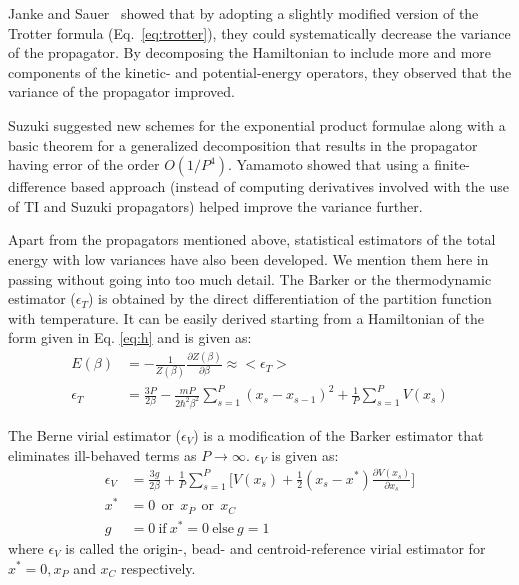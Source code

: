         Janke and Sauer~\cite{Janke1992} showed that by adopting a slightly modified version of the Trotter formula (Eq.~\eqref{eq:trotter}), they could systematically decrease the variance of the propagator. By decomposing the Hamiltonian to include more and more components of the kinetic- and potential-energy operators, they observed that the variance of the propagator improved.

        Suzuki \cite{Suzuki1995} suggested new schemes for the exponential product formulae along with a basic theorem for a generalized decomposition that results in the propagator having error of the order $O(1/P^4)$. Yamamoto \cite{Yamamoto2005} showed that using a finite-difference based approach (instead of computing derivatives involved with the use of TI and Suzuki propagators) helped improve the variance further.
        
        Apart from the propagators mentioned above, statistical estimators of the total energy with low variances have also been developed. We mention them here in passing without going into too much detail. The Barker or the thermodynamic estimator\cite{Barker1979} ($\epsilon_T$) is obtained by the direct differentiation of the partition function with temperature. It can be easily derived starting from a Hamiltonian of the form given in Eq. \eqref{eq:h} and is given as:
        \begin{equation}\label{eT}
            \begin{aligned}
                E(\beta) &= - \displaystyle\frac{1}{Z(\beta)} \frac{\partial Z(\beta)}{\partial \beta} \approx <\epsilon_T>\\
                \epsilon_T &= \displaystyle\frac{3P}{2\beta} - \frac{mP}{2\hbar^2 \beta^2} \sum\limits_{s=1}^P (x_s - x_{s-1})^2 + \frac{1}{P} \sum\limits_{s=1}^P V(x_s)
            \end{aligned}
        \end{equation}

        The Berne virial estimator\cite{Cao1989} ($\epsilon_V$) is a modification of the Barker estimator that eliminates ill-behaved terms  as $P \to \infty$. $\epsilon_V$ is given as:
        \begin{equation}\label{eV}
            \begin{aligned}
                \epsilon_V &= \displaystyle\frac{3g}{2\beta} + \frac{1}{P} \sum\limits_{s=1}^P \bigg[ V(x_s) + \frac{1}{2} (x_s - x^*) \frac{\partial V(x_s)}{\partial x_s} \bigg]\\
                x^* &= 0\: \: \text{or}\:\: x_P \: \:\text{or} \:\: x_C\\
                g &= 0 ~\text{if}~ x^* = 0~ \text{else}~ g = 1
            \end{aligned}
        \end{equation}
        where $\epsilon_V$ is called the origin-, bead- and centroid-reference virial estimator for $x^* = 0, x_P$ and $x_C$ respectively.

